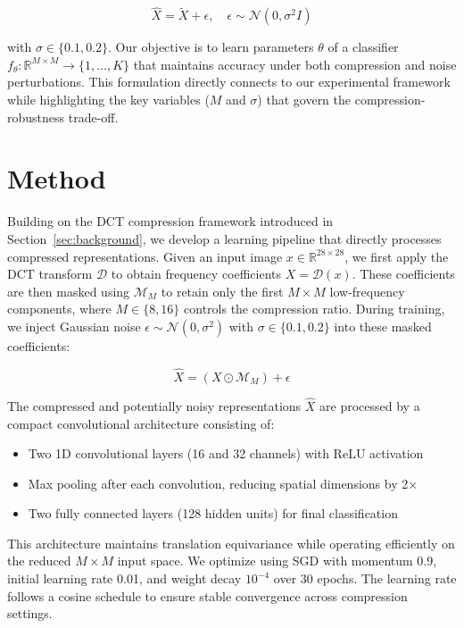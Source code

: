 \documentclass{article} %
\begin{document}
\begin{equation}
    \hat{X} = \tilde{X} + \epsilon, \quad \epsilon \sim \mathcal{N}(0, \sigma^2I)
\end{equation}

with $\sigma \in \{0.1,0.2\}$. Our objective is to learn parameters $\theta$ of a classifier $f_\theta: \mathbb{R}^{M \times M} \rightarrow \{1,\ldots,K\}$ that maintains accuracy under both compression and noise perturbations. This formulation directly connects to our experimental framework while highlighting the key variables ($M$ and $\sigma$) that govern the compression-robustness trade-off.

\section{Method}
\label{sec:method}

Building on the DCT compression framework introduced in Section~\ref{sec:background}, we develop a learning pipeline that directly processes compressed representations. Given an input image $x \in \mathbb{R}^{28 \times 28}$, we first apply the DCT transform $\mathcal{D}$ to obtain frequency coefficients $X = \mathcal{D}(x)$. These coefficients are then masked using $\mathcal{M}_M$ to retain only the first $M \times M$ low-frequency components, where $M \in \{8, 16\}$ controls the compression ratio. During training, we inject Gaussian noise $\epsilon \sim \mathcal{N}(0, \sigma^2)$ with $\sigma \in \{0.1, 0.2\}$ into these masked coefficients:

\begin{equation}
    \hat{X} = (X \odot \mathcal{M}_M) + \epsilon
\end{equation}

The compressed and potentially noisy representations $\hat{X}$ are processed by a compact convolutional architecture consisting of:
\begin{itemize}
    \item Two 1D convolutional layers (16 and 32 channels) with ReLU activation
    \item Max pooling after each convolution, reducing spatial dimensions by 2×
    \item Two fully connected layers (128 hidden units) for final classification
\end{itemize}

This architecture maintains translation equivariance while operating efficiently on the reduced $M \times M$ input space. We optimize using SGD with momentum 0.9, initial learning rate 0.01, and weight decay $10^{-4}$ over 30 epochs. The learning rate follows a cosine schedule to ensure stable convergence across compression settings.
\end{document}
